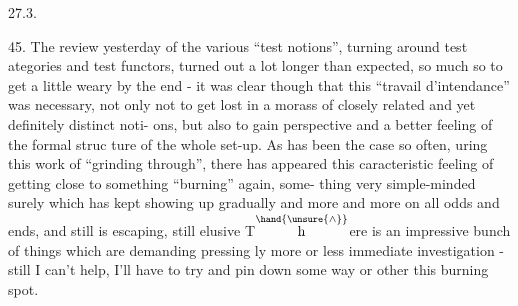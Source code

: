 27.3.

45.    The review yesterday of the various ``test notions'',  turning
around test ategories and test functors,  turned out a lot longer than
expected,  so much so  to  get a little weary by the end  -  it was clear
though that this ``travail d'intendance'' was necessary,  not only not to
get lost in a morass of closely related and yet definitely distinct noti-%
ons,  but also to gain perspective and a better feeling of the formal struc%
ture of the whole set-up.  As has been the case so often, uring this
  work of ``grinding through'',  there has appeared  this
caracteristic feeling of getting close to something ``burning'' again, some-%
thing very simple-minded surely which has kept showing up gradually and
more and more on all odds and ends,  and  still is escaping,  still elusive
T$\overset{\hand{\unsure{\wedge}}}{\mathrm{h}}$ere is an impressive bunch of things  which are demanding pressing%
ly  more or less immediate investigation  -  still I can't help,  I'll
have to try and pin down some way or other this burning spot.

